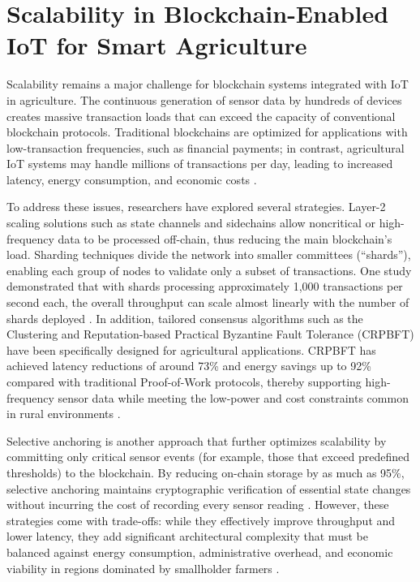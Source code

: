 \documentclass[12pt,onecolumn]{IEEEtran} %
\begin{document}
\section{Scalability in Blockchain-Enabled IoT for Smart Agriculture}
Scalability remains a major challenge for blockchain systems integrated with IoT in agriculture. The continuous generation of sensor data by hundreds of devices creates massive transaction loads that can exceed the capacity of conventional blockchain protocols. Traditional blockchains are optimized for applications with low-transaction frequencies, such as financial payments; in contrast, agricultural IoT systems may handle millions of transactions per day, leading to increased latency, energy consumption, and economic costs \cite{huang2025digitaltraceabilityin, irfan2025aniotdrivensmart}.

To address these issues, researchers have explored several strategies. Layer-2 scaling solutions such as state channels and sidechains allow noncritical or high-frequency data to be processed off-chain, thus reducing the main blockchain's load. Sharding techniques divide the network into smaller committees (``shards''), enabling each group of nodes to validate only a subset of transactions. One study demonstrated that with shards processing approximately 1,000 transactions per second each, the overall throughput can scale almost linearly with the number of shards deployed \cite{huang2025digitaltraceabilityin, abdurrohim2024blockchainbasedframeworkfor}. In addition, tailored consensus algorithms such as the Clustering and Reputation-based Practical Byzantine Fault Tolerance (CRPBFT) have been specifically designed for agricultural applications. CRPBFT has achieved latency reductions of around 73\% and energy savings up to 92\% compared with traditional Proof-of-Work protocols, thereby supporting high-frequency sensor data while meeting the low-power and cost constraints common in rural environments \cite{thiruvenkatasamy2025anonlinetool, huang2025digitaltraceabilityin}.

Selective anchoring is another approach that further optimizes scalability by committing only critical sensor events (for example, those that exceed predefined thresholds) to the blockchain. By reducing on-chain storage by as much as 95\%, selective anchoring maintains cryptographic verification of essential state changes without incurring the cost of recording every sensor reading \cite{huang2025digitaltraceabilityin, irfan2025aniotdrivensmart}. However, these strategies come with trade-offs: while they effectively improve throughput and lower latency, they add significant architectural complexity that must be balanced against energy consumption, administrative overhead, and economic viability in regions dominated by smallholder farmers \cite{huang2025digitaltraceabilityin, irfan2025aniotdrivensmart}.
\end{document}

